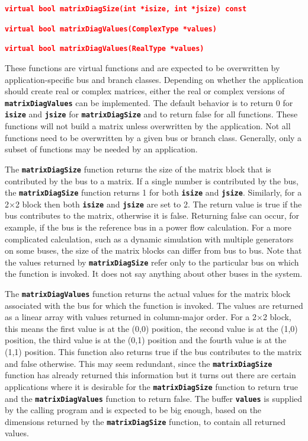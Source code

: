 \documentclass[12pt]{report} %
\begin{document}
\textcolor{red}{\texttt{\textbf{virtual bool matrixDiagSize(int *isize, int *jsize) const}}}

\textcolor{red}{\texttt{\textbf{virtual bool matrixDiagValues(ComplexType *values)}}}

\textcolor{red}{\texttt{\textbf{virtual bool matrixDiagValues(RealType *values)}}}


These functions are virtual functions and are expected to be overwritten by application-specific bus and branch classes. Depending on whether the application should create real or complex matrices, either the real or complex versions of \texttt{\textbf{matrixDiagValues}} can be implemented. The default behavior is to return 0 for \texttt{\textbf{isize}} and \texttt{\textbf{jsize}} for \texttt{\textbf{matrixDiagSize}} and to return false for all functions. These functions will not build a matrix unless overwritten by the application. Not all functions need to be overwritten by a given bus or branch class. Generally, only a subset of functions may be needed by an application.

The \texttt{\textbf{matrixDiagSize}} function returns the size of the matrix block that is contributed by the bus to a matrix. If a single number is contributed by the bus, the \texttt{\textbf{matrixDiagSize}} function returns 1 for both \texttt{\textbf{isize}} and \texttt{\textbf{jsize}}. Similarly, for a 2$\mathrm{\times}$2 block then both \texttt{\textbf{isize}} and \texttt{\textbf{jsize}} are set to 2. The return value is true if the bus contributes to the matrix, otherwise it is false. Returning false can occur, for example, if the bus is the reference bus in a power flow calculation. For a more complicated calculation, such as a dynamic simulation with multiple generators on some buses, the size of the matrix blocks can differ from bus to bus. Note that the values returned by \texttt{\textbf{matrixDiagSize}} refer only to the particular bus on which the function is invoked. It does not say anything about other buses in the system.

The \texttt{\textbf{matrixDiagValues}} function returns the actual values for the matrix block associated with the bus for which the function is invoked. The values are returned as a linear array with values returned in column-major order. For a 2$\mathrm{\times}$2 block, this means the first value is at the (0,0) position, the second value is at the (1,0) position, the third value is at the (0,1) position and the fourth value is at the (1,1) position. This function also returns true if the bus contributes to the matrix and false otherwise. This may seem redundant, since the \texttt{\textbf{matrixDiagSize}} function has already returned this information but it turns out there are certain applications where it is desirable for the \texttt{\textbf{matrixDiagSize}} function to return true and the \texttt{\textbf{matrixDiagValues}} function to return false. The buffer \texttt{\textbf{values}} is supplied by the calling program and is expected to be big enough, based on the dimensions returned by the \texttt{\textbf{matrixDiagSize}} function, to contain all returned values.
\end{document}
